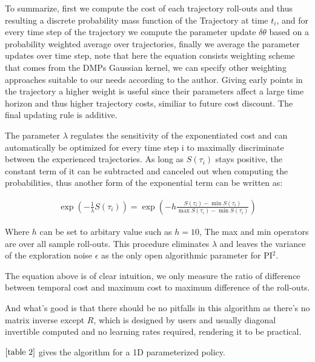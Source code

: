 \documentclass[journal]{IEEEtran}
\begin{document}
To summarize, first we compute the cost of each trajectory roll-outs and thus resulting a discrete probability mass function of the Trajectory at time $t_i$, and for every time step of the
trajectory we compute the parameter update $\delta \theta$ based on a probability weighted average over trajectories, finally we average the parameter updates over time step, note that here the equation consists weighting 
scheme that comes from the DMPs Gaussian kernel, we can specify other weighting approaches suitable to our needs according to the author. Giving early points in the trajectory a higher weight is useful since their parameters affect a large time horizon and thus higher trajectory costs,
similiar to future cost discount. The final updating rule is additive.


The parameter $\lambda$ regulates the sensitivity of the exponentiated cost and can automatically be optimized for every time step i to maximally discriminate between the experienced trajectories. 
As long as $S(\tau_i)$ stays positive, the constant term of it can be subtracted and canceled out when computing the probabilities, thus another form of the exponential term can be written as: 

\begin{equation}
  \begin{aligned}
    \exp(-\frac{1}{\lambda} S(\tau_i)) = \exp( -h \frac{S(\tau_i) - \min S(\tau_i)}{\max S(\tau_i) - \min S(\tau_i)})
     \end{aligned}
\end{equation}

Where $h$ can be set to arbitary value such as $h = 10$, The max and min operators are over all sample roll-outs. This procedure eliminates $\lambda$ and leaves the variance of the exploration noise $\epsilon$ as the only open algorithmic parameter for PI$^2$.

The equation above is of clear intuition, we only measure the ratio of difference between temporal cost and maximum cost to maximum difference of the roll-outs.

And what's good is that there should be no pitfalls in this algorithm as there's no matrix inverse except $R$, which is designed by users and usually diagonal invertible computed and no learning rates required, rendering it to be practical.

$\ref{table 2}$ gives the algorithm for a 1D parameterized policy.
\end{document}
